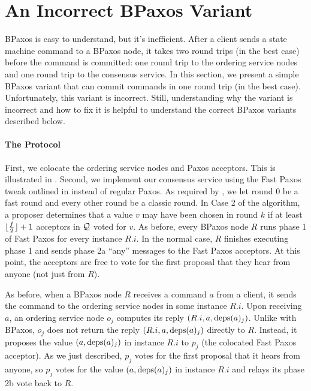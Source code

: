 \section{An Incorrect BPaxos Variant}
BPaxos is easy to understand, but it's inefficient. After a client sends a
state machine command to a BPaxos node, it takes two round trips (in the best
case) before the command is committed: one round trip to the ordering service
nodes and one round trip to the consensus service. In this section, we present
a simple BPaxos variant that can commit commands in one round trip (in the best
case). Unfortunately, this variant is incorrect. Still, understanding why the
variant is incorrect and how to fix it is helpful to understand the correct
BPaxos variants described below.

\paragraph{The Protocol}
First, we colocate the ordering service nodes and Paxos acceptors. This is
illustrated in .
%
Second, we implement our consensus service using the Fast Paxos tweak outlined
in  instead of regular Paxos. As required by
, we let round $0$ be a fast round and every other
round be a classic round. In Case 2 of the algorithm, a proposer determines
that a value $v$ may have been chosen in round $k$ if at least
$\lfloor\frac{f}{2}\rfloor + 1$ acceptors in $\mathcal{Q}$ voted for $v$. As before, every
BPaxos node $R$ runs phase 1 of Fast Paxos for every instance $R.i$. In the
normal case, $R$ finishes executing phase 1 and sends phase 2a ``any'' messages
to the Fast Paxos acceptors. At this point, the acceptors are free to vote for
the first proposal that they hear from anyone (not just from $R$).

{}

As before, when a BPaxos node $R$ receives a command $a$ from a client, it
sends the command to the ordering service nodes in some instance $R.i$. Upon
receiving $a$, an ordering service node $o_j$ computes its reply $(R.i, a,
\text{deps}(a)_j)$. Unlike with BPaxos, $o_j$ does not return the reply $(R.i, a,
\text{deps}(a)_j)$ directly to $R$. Instead, it proposes the value $(a, \text{deps}(a)_j)$
in instance $R.i$ to $p_j$ (the colocated Fast Paxos acceptor). As we just
described, $p_j$ votes for the first proposal that it hears from anyone, so
$p_j$ votes for the value $(a, \text{deps}(a)_j)$ in instance $R.i$ and relays its
phase 2b vote back to $R$.

